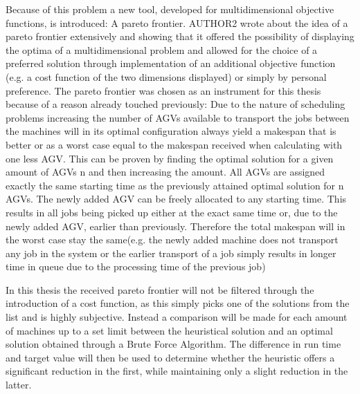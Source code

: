 Because of this problem a new tool, developed for multidimensional objective functions, is introduced: A pareto frontier. AUTHOR2 wrote about the
idea of a pareto frontier extensively and showing that it offered the possibility of displaying the optima of a multidimensional problem and allowed
for the choice of a preferred solution through implementation of an additional objective function (e.g. a cost function of the two dimensions
displayed) or simply by personal preference. The pareto frontier was chosen as an instrument for this thesis because of a reason already touched
previously: Due to the nature of scheduling problems increasing the number of AGVs available to transport the jobs between the machines will in
its optimal configuration always yield a makespan that is better or as a worst case equal to the makespan received when calculating with one less
AGV. This can be proven by finding the optimal solution for a given amount of AGVs n and then increasing the amount. All AGVs are assigned
exactly the same starting time as the previously attained optimal solution for n AGVs. The newly added AGV can be freely allocated to any starting
time. This results in all jobs being picked up either at the exact same time or, due to the newly added AGV, earlier than previously.
Therefore the total makespan will in the worst case stay the same(e.g. the newly added machine does not transport any job in the system or the
earlier transport of a job simply results in longer time in queue due to the processing time of the previous job)

In this thesis the received pareto frontier will not be filtered through the introduction of a cost function, as this simply picks one of the solutions
from the list and is highly subjective. Instead a comparison will be made for each amount of machines up to a set limit between the heuristical solution and an optimal
solution obtained through a Brute Force Algorithm. The difference in run time and target value will then be used to determine whether the heuristic
offers a significant reduction in the first, while maintaining only a slight reduction in the latter.

